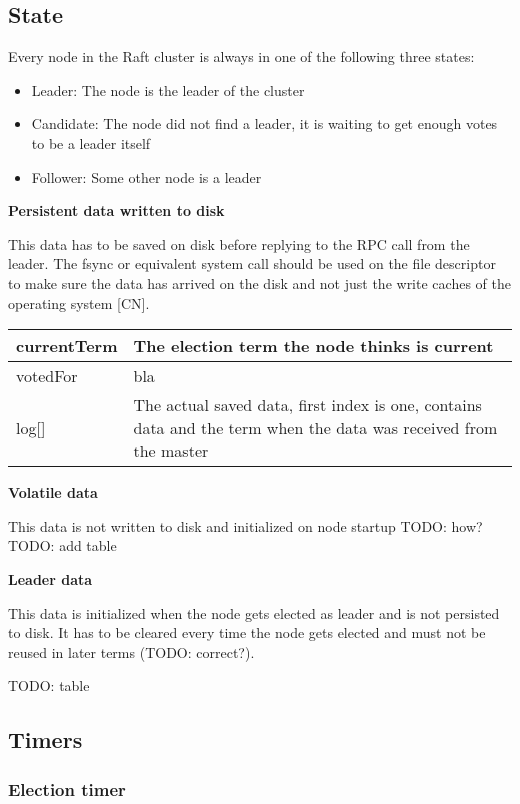 \subsection{State}
Every node in the Raft cluster is always in one of the following three states:
\begin{itemize}
    \item Leader: The node is the leader of the cluster
    \item Candidate: The node did not find a leader, it is waiting to get enough votes to be a leader itself
    \item Follower: Some other node is a leader
\end{itemize}

\textbf{Persistent data written to disk}

This data has to be saved on disk before replying to the RPC call from the leader. The fsync or equivalent system call should be used on the file descriptor to make sure the data has arrived on the disk and not just the write caches of the operating system [CN].

\begin{tabular}{ | l | p{} | }
\hline
currentTerm & The election term the node thinks is current \\ \hline
votedFor & bla \\ \hline
log[] & The actual saved data, first index is one, contains data and the term when the data was received from the master \\ \hline
\end{tabular}

\textbf{Volatile data}

This data is not written to disk and initialized on node startup
TODO: how?
TODO: add table

\textbf{Leader data}

This data is initialized when the node gets elected as leader and is not persisted to disk.
It has to be cleared every time the node gets elected and must not be reused in later terms (TODO: correct?).

TODO: table


\subsection{Timers}

\subsubsection*{Election timer}

